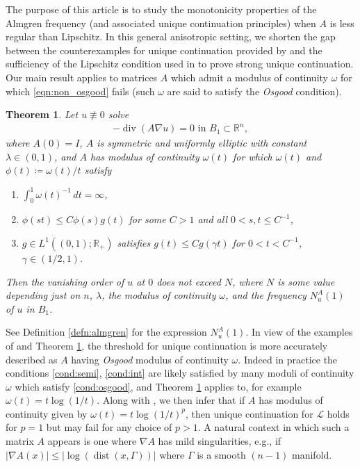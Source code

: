 \documentclass[12pt,leqno]{amsart}
\numberwithin{equation}{section}
\newtheorem{thm}[lemma]{Theorem}
\theoremstyle{definition}
\newcommand{\R}{\mathbb{R}}
\newcommand{\abs}[1]{\left \lvert #1 \right \rvert}
\DeclareMathOperator{\divv}{\mathrm{div}}
\DeclareMathOperator{\dist}{\mathrm{dist}}
\begin{document}
 
The purpose of this article is to study the monotonicity properties of the Almgren frequency (and associated unique continuation principles) when $A$ is less regular than Lipschitz. In this general anisotropic setting, we shorten the gap between the counterexamples for unique continuation provided by \cite{Mandache-ceg} and the sufficiency of the Lipschitz condition used in \cite{GL86} to prove strong unique continuation. Our main result applies to matrices $A$ which admit a modulus of continuity $\omega$ for which \eqref{eqn:non_osgood} fails (such $\omega$ are said to satisfy the \textit{Osgood} condition).
\begin{thm}\label{thm:main_anis}
	Let $u \not \equiv 0$ solve 
	\begin{align*}
		-\divv(A \nabla u) = 0 \text{ in } B_1 \subset \R^n,
	\end{align*}
	where $A(0) = I$, $A$ is symmetric and uniformly elliptic with constant $\lambda \in (0,1)$, and $A$ has modulus of continuity $\omega(t)$ for which $\omega(t)$ and $\phi(t) \coloneqq \omega(t)/t$ satisfy
	\begin{enumerate}
		\item $\int_0^1 \omega(t)^{-1} \, dt = \infty$, \label{cond:osgood}
		\item $\phi(st) \le C \phi(s) g(t)$ for some $C> 1$ and all $0 < s, t \le C^{-1}$, \label{cond:semi}
		\item $g \in L^1((0, 1); \R_+)$ satisfies $g(t) \le C g(\gamma t)$ for $0 < t <C^{-1}$, $\gamma \in (1/2, 1)$. \label{cond:int}
	\end{enumerate}
	Then the vanishing order of $u$ at $0$ does not exceed $N$, where $N$ is some value depending just on $n$, $\lambda$, the modulus of continuity $\omega$, and the frequency $N_u^A(1)$ of $u$ in $B_1$.
\end{thm}
See Definition \ref{defn:almgren} for the expression $N_u^A(1)$. In view of the examples of \cite{Mandache-ceg} and Theorem \ref{thm:main_anis}, the threshold for unique continuation is more accurately described as $A$ having \textit{Osgood} modulus of continuity $\omega$. Indeed in practice the conditions \eqref{cond:semi}, \eqref{cond:int} are likely satisfied by many moduli of continuity $\omega$ which satisfy \eqref{cond:osgood}, and Theorem \ref{thm:main_anis} applies to, for example $\omega(t) = t \log(1/t)$. Along with \cite{Mandache-ceg}, we then infer that if $A$ has modulus of continuity given by $\omega(t) = t \log(1/t)^p$, then unique continuation for $\mathcal{L}$ holds for $p =1$ but may fail for any choice of $p >1$. A natural context in which such a matrix $A$ appears is one where $\nabla A$ has mild singularities, e.g., if $\abs{\nabla A(x)} \le \abs{\log(\dist(x, \Gamma))}$ where $\Gamma$ is a smooth $(n-1)$ manifold. 
\end{document}
